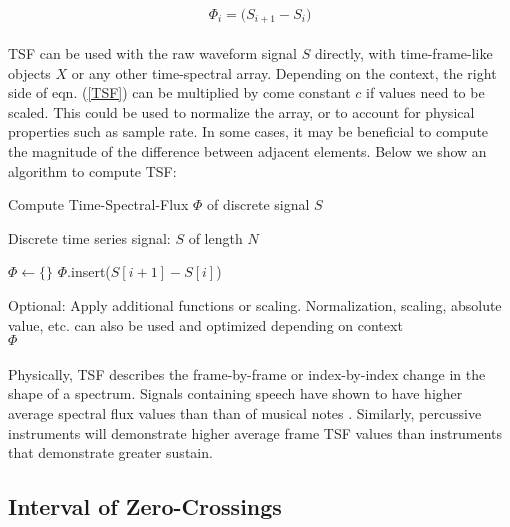 \documentclass[12pt,letterpaper]{article}
\begin{document}
\begin{equation}
\label{TSF}
\Phi_{i} = \big( S_{i+1} - S_{i} \big)
\end{equation} 

\paragraph*{}TSF can be used with the raw waveform signal $S$ directly, with time-frame-like objects $X$ or any other time-spectral array. Depending on the context, the right side of eqn. (\ref{TSF}) can be multiplied by come constant $c$ if values need to be scaled. This could be used to normalize the array, or to account for physical properties such as sample rate. In some cases, it may be beneficial to compute the magnitude of the difference between adjacent elements. Below we show an algorithm to compute TSF:

\begin{algorithm}
\label{TSF alg}
\caption{Compute Time-Spectral-Flux $\Phi$ of discrete signal $S$}
\begin{algorithmic}
\REQUIRE Discrete time series signal: $S$ of length $N$

$\Phi \leftarrow \{\}$
	\STATE $\Phi$.insert($S[i+1] - S[i]$)
\ENDFOR

Optional: Apply additional functions or scaling. Normalization, scaling, absolute value, etc. can also be used and optimized depending on context \\
\RETURN $\Phi$

\end{algorithmic}
\end{algorithm}

\paragraph*{}Physically, TSF describes the frame-by-frame or index-by-index change in the shape of a spectrum. Signals containing speech have shown to have higher average spectral flux values than than of musical notes \cite{Kahn 2006,Zhang 1998}. Similarly, percussive instruments will demonstrate higher average frame TSF values than instruments that demonstrate greater sustain.


\subsection*{Interval of Zero-Crossings}
\end{document}
